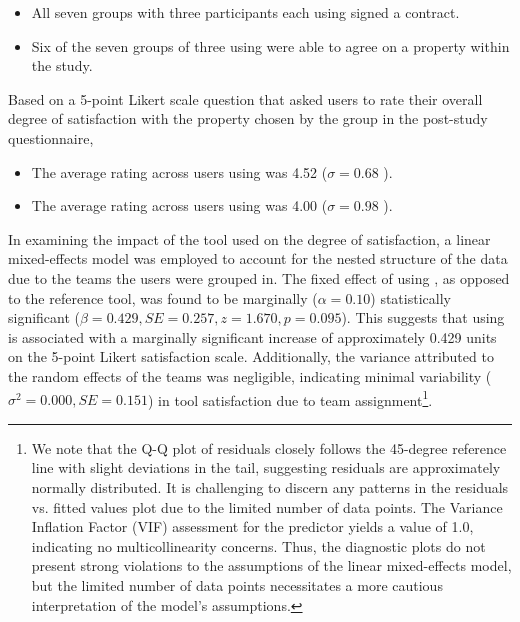 \begin{itemize}
    \item All seven groups with three participants each using \tool  signed a contract.
    \item Six of the seven groups of three using \baseline were able to agree on a property within the study.
\end{itemize}

Based on a 5-point Likert scale question that asked users to rate their overall degree of satisfaction with the property chosen by the group in the post-study questionnaire,
\begin{itemize}
    \item The average rating across users using \tool was 4.52 ($\sigma = 0.68$ ).
    \item The average rating across users using \baseline was 4.00 ($\sigma = 0.98$ ).
\end{itemize}
    
In examining the impact of the tool used on the degree of satisfaction, a linear mixed-effects model was employed to account for the nested structure of the data due to the teams the users were grouped in. The fixed effect of using \tool, as opposed to the reference \baseline tool, was found to be marginally ($\alpha = 0.10$) statistically significant ($\beta = 0.429, SE = 0.257, z = 1.670, p = 0.095$). This suggests that using \tool is associated with a marginally significant increase of approximately 0.429 units on the 5-point Likert satisfaction scale. Additionally, the variance attributed to the random effects of the teams was negligible, indicating minimal variability ($\sigma^2 = 0.000, SE=0.151$) in tool satisfaction due to team assignment\footnote{We note that the Q-Q plot of residuals closely follows the 45-degree reference line with slight deviations in the tail, suggesting residuals are approximately normally distributed. It is challenging to discern any patterns in the residuals vs. fitted values plot due to the limited number of data points. The Variance Inflation Factor (VIF) assessment for the predictor \tool yields a value of 1.0, indicating no multicollinearity concerns. Thus, the diagnostic plots do not present strong violations to the assumptions of the linear mixed-effects model, but the limited number of data points necessitates a more cautious interpretation of the model's assumptions.}. 

